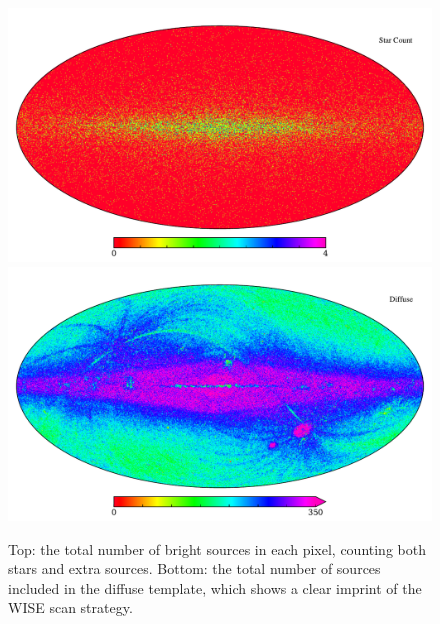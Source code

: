 \documentclass{aa}
\begin{document}
\begin{figure}
  \centering
  \includegraphics[width=\columnwidth]{figs/sourcecount/source_count.pdf}\\
  \includegraphics[width=\columnwidth]{figs/sourcecount/diffuse_count.pdf}
  \caption{Top: the total number of bright sources in each pixel, counting both stars and extra sources. Bottom: the total number of sources included in the diffuse template, which shows a clear imprint of the WISE scan strategy.}
  \label{fig:starcount}
\end{figure}
\end{document}
